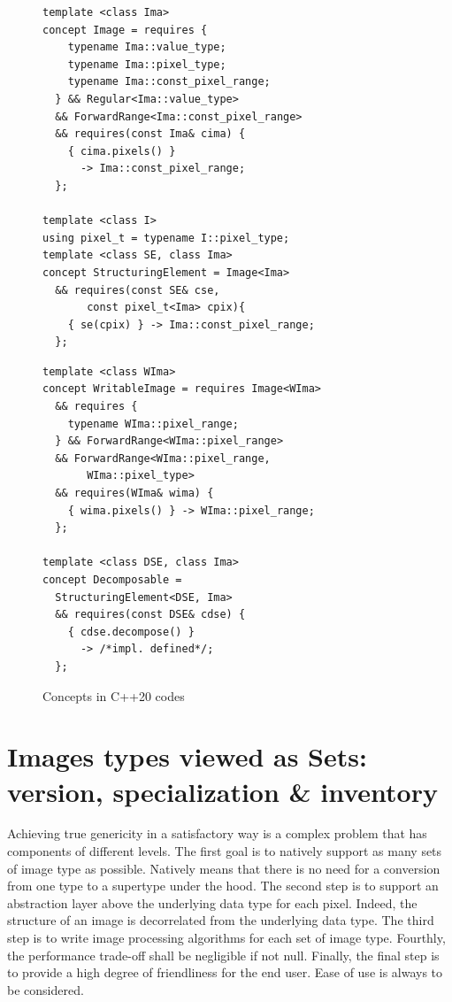 \begin{figure}[htbp]

  \begin{minipage}[l]{0.48\linewidth}
    \begin{verbatim}
template <class Ima>
concept Image = requires {
    typename Ima::value_type;
    typename Ima::pixel_type;
    typename Ima::const_pixel_range;
  } && Regular<Ima::value_type>
  && ForwardRange<Ima::const_pixel_range>
  && requires(const Ima& cima) {
    { cima.pixels() }
      -> Ima::const_pixel_range;
  };

template <class I>
using pixel_t = typename I::pixel_type;
template <class SE, class Ima>
concept StructuringElement = Image<Ima>
  && requires(const SE& cse,
       const pixel_t<Ima> cpix){
    { se(cpix) } -> Ima::const_pixel_range;
  };
\end{verbatim}
  \end{minipage}
  \hfill
  \begin{minipage}[r]{0.48\linewidth}
    \begin{verbatim}
template <class WIma>
concept WritableImage = requires Image<WIma>
  && requires {
    typename WIma::pixel_range;
  } && ForwardRange<WIma::pixel_range>
  && ForwardRange<WIma::pixel_range,
       WIma::pixel_type>
  && requires(WIma& wima) {
    { wima.pixels() } -> WIma::pixel_range;
  };

template <class DSE, class Ima>
concept Decomposable =
  StructuringElement<DSE, Ima>
  && requires(const DSE& cdse) {
    { cdse.decompose() }
      -> /*impl. defined*/;
  };
\end{verbatim}
  \end{minipage}

  \caption{Concepts in C++20 codes}
  \label{code:concept.cpp20}
\end{figure}


\section{Images types viewed as Sets: version, specialization \& inventory}
\label{sec:image.set}

Achieving true genericity in a satisfactory way is a complex problem that has components of different levels. The first
goal is to natively support as many sets of image type as possible. Natively means that there is no need for a
conversion from one type to a supertype under the hood. The second step is to support an abstraction layer above the
underlying data type for each pixel. Indeed, the structure of an image is decorrelated from the underlying data type.
The third step is to write image processing algorithms for each set of image type. Fourthly, the performance trade-off
shall be negligible if not null. Finally, the final step is to provide a high degree of friendliness for the end user.
Ease of use is always to be considered.

